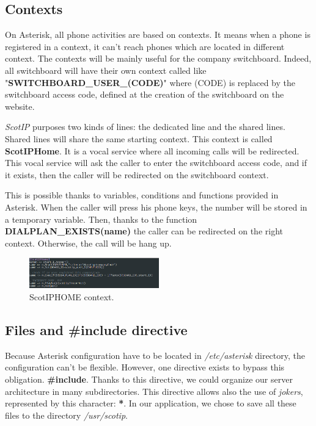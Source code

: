 \subsection{Contexts}
On Asterisk, all phone activities are based on contexts. It means when a phone is registered in a context, it can't reach phones which are located in different context. The contexts will be mainly useful for the company switchboard. Indeed, all switchboard will have their own context called like "\textbf{SWITCHBOARD\_USER\_(CODE)}" where (CODE) is replaced by the switchboard access code, defined at the creation of the switchboard on the website.


\textit{ScotIP} purposes two kinds of lines: the dedicated line and the shared lines.
Shared lines will share the same starting context. This context is called \textbf{ScotIPHome}. It is a vocal service where all incoming calls will be redirected. This vocal service will ask the caller to enter the switchboard access code, and if it exists, then the caller will be redirected on the switchboard context.


This is possible thanks to variables, conditions and functions provided in Asterisk. When the caller will press his phone keys, the number will be stored in a temporary variable. Then, thanks to the function \textbf{DIALPLAN\_EXISTS(name)} the caller can be redirected on the right context. Otherwise, the call will be hang up. 


\begin{figure}[!ht]
  \caption{ScotIPHOME context.}
  \centering
    \includegraphics[width=0.5\textwidth]{img/context_scotiphome.png}
\end{figure}

\subsection{Files and \#include directive}

Because Asterisk configuration have to be located in \textit{/etc/asterisk} directory, the configuration can't be flexible. However, one directive exists to bypass this obligation. \textbf{\#include}. Thanks to this directive, we could organize our server architecture in many subdirectories. This directive allows also the use of \textit{jokers}, represented by this character: \textbf{*}. In our application, we chose to save all these files to the directory \textit{/usr/scotip}.

